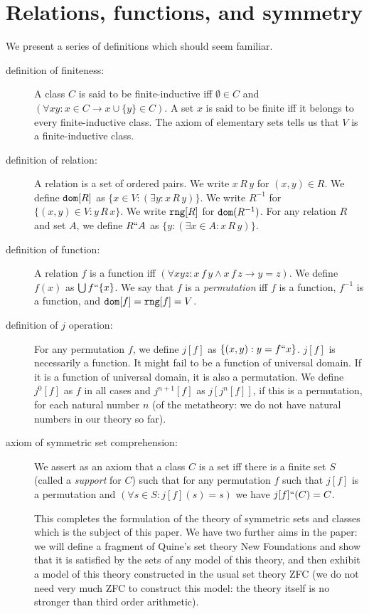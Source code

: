 \documentclass{article}
\begin{document}
\section{Relations, functions, and symmetry}

We present a series of definitions which should seem familiar.

\begin{description}

\item[definition of finiteness:]   A class $C$ is said to be finite-inductive iff $\emptyset \in C$ and $(\forall xy:x \in C \rightarrow x \cup \{y\} \in C)$.  A set $x$ is said to be finite iff it belongs to every finite-inductive class.  The axiom of elementary sets tells us that $V$ is a finite-inductive class.

\item[definition of relation:]  A relation is a set of ordered pairs.  We write $x \,R\, y$ for $(x,y) \in R$.  We define ${\tt dom}[R]$ as $\{x \in V:(\exists y:x\,R\,y)\}$.  We write $R^{-1}$ for $\{(x,y) \in V:y\,R\,x\}$.  We write ${\tt rng}[R]$ for ${\tt dom}(R^{-1})$.  For any relation $R$ and set $A$, we define $R``A$ as $\{y:(\exists x \in A:x \, R\,y)\}$.

\item[definition of function:]  A relation $f$ is a function iff $(\forall xyz:x \,f\,y \wedge x\,f\,z \rightarrow y=z)$.   We define $f(x)$ as $\bigcup f``\{x\}$.   We say that $f$ is a {\em permutation\/} iff $f$ is a function, $f^{-1}$ is a function, and ${\tt dom}[f] = {\tt rng}[f]=V$.

\item[definition of $j$ operation:]  For any permutation $f$, we define $j[f]$ as $\{(x,y):y=f``x\}$.  $j[f]$ is necessarily a function.  It might fail to be a function of universal domain.  If it is a function of universal domain, it is also a permutation.  We define $j^0[f]$ as $f$ in all cases and $j^{n+1}[f]$ as
$j[j^n[f]]$, if this is a permutation,  for each natural number $n$ (of the metatheory:  we do not have natural numbers in our theory so far).

\item[axiom of symmetric set comprehension:]  We assert as an axiom that a class $C$ is a set iff there is a finite set $S$ (called a {\em support\/} for $C$)
such that for any permutation $f$ such that $j[f]$ is a permutation and $(\forall s \in S:j[f](s)=s)$ we have  $j[f]``(C) = C$.

This completes the formulation of the theory of symmetric  sets and classes which is the subject of this paper.
We have two further aims in the paper:  we will define a fragment of Quine's set theory New Foundations and show that it is satisfied by the sets of any model of this theory, and then exhibit a model of this theory constructed in the usual set theory ZFC (we do not need very much ZFC to construct this model:  the theory itself is no stronger than third order arithmetic).


\end{description}
\end{document}
